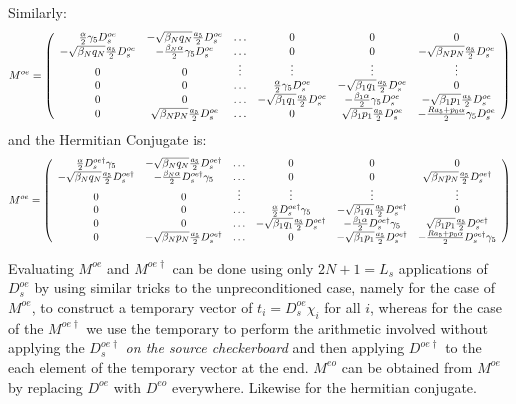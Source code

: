 \documentclass[12pt]{article}
\begin{document}
Similarly:
\begin{equation}
M^{oe} = \left( \begin{array}{cccccc}
\frac{\alpha}{2}\gamma_5 D^{oe}_s & -\sqrt{\beta_N q_N}\frac{a_5}{2} D^{oe}_s & \ldots & 0 & 0 & 0 \\
 -\sqrt{\beta_N q_N}\frac{a_5}{2} D^{oe}_s & -\frac{\beta_N \alpha}{2}\gamma_5 D^{oe}_s & \ldots & 0 & 0 & -\sqrt{\beta_N p_N}\frac{a_5}{2} D^{oe}_s \\
0 & 0 & \vdots & \vdots & \vdots & \vdots \\
0 & 0 & \ldots &  \frac{\alpha}{2} \gamma_5 D^{oe}_s & -\sqrt{\beta_1 q_1}\frac{a_5}{2}D^{oe}_s & 0 \\
0 & 0 & \ldots &  -\sqrt{\beta_1 q_1}\frac{a_5}{2} D^{oe}_s &  -\frac{\beta_1 \alpha}{2}\gamma_5 D^{oe}_s & -\sqrt{\beta_1 p_1}\frac{a_5}{2} D^{oe}_s \\
0 &  \sqrt{\beta_N p_N}\frac{a_5}{2} D^{oe}_s & \ldots & 0 &  \sqrt{\beta_1 p_1}\frac{a_5}{2} D^{oe}_s & -\frac{R a_5 + p_0 \alpha}{2} \gamma_5 D_s^{oe}
\end{array} \right)
\end{equation}
and the Hermitian Conjugate is:
\begin{equation}
M^{oe} = \left( \begin{array}{cccccc}
\frac{\alpha}{2} D^{oe\dagger}_s \gamma_5  & -\sqrt{\beta_N q_N}\frac{a_5}{2} D^{oe\dagger}_s & \ldots & 0 & 0 & 0 \\
 -\sqrt{\beta_N q_N}\frac{a_5}{2} D^{oe\dagger}_s & -\frac{\beta_N \alpha}{2} D^{oe\dagger}_s \gamma_5& \ldots & 0 & 0 & \sqrt{\beta_N p_N}\frac{a_5}{2} D^{oe\dagger}_s \\
0 & 0 & \vdots & \vdots & \vdots & \vdots \\
0 & 0 & \ldots &  \frac{\alpha}{2} D^{oe\dagger}_s \gamma_5 & -\sqrt{\beta_1 q_1}\frac{a_5}{2} D^{oe\dagger}_s & 0 \\
0 & 0 & \ldots &  -\sqrt{\beta_1 q_1}\frac{a_5}{2}D^{oe\dagger }_s &  -\frac{\beta_1 \alpha}{2}D^{oe \dagger}_s\gamma_5 & \sqrt{\beta_1 p_1}\frac{a_5}{2} D^{oe \dagger}_s \\
0 &  -\sqrt{\beta_N p_N}\frac{a_5}{2} D^{oe\dagger}_s & \ldots & 0 &  -\sqrt{\beta_1 p_1}\frac{a_5}{2} D^{oe\dagger }_s & -\frac{R a_5 + p_0 \alpha}{2} D_s^{oe \dagger} \gamma_5
\end{array} \right)
\end{equation}

Evaluating $M^{oe}$ and $M^{oe\dagger}$ can be done using only $2N+1=L_s$ 
applications of $D^{oe}_s$ by using similar tricks to the unpreconditioned
case, namely for the case of $M^{oe}$, to construct a temporary vector 
of $t_i = D^{oe}_s \chi_{i}$ for all ${i}$, whereas for the case of the
$M^{oe\dagger}$ we use the temporary to perform the arithmetic involved
without applying the $D^{oe\dagger}_{s}$ {\em on the source checkerboard}
and then applying $D^{oe\dagger}$ to the each element of the temporary 
vector at the end. $M^{eo}$ can be obtained from $M^{oe}$ by replacing
$D^{oe}$ with $D^{eo}$ everywhere. Likewise for the hermitian conjugate.
\end{document}
